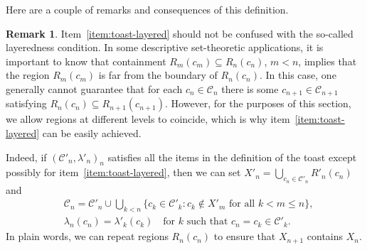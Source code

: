 \documentclass[12pt]{paper}
\numberwithin{equation}{section}
\theoremstyle{plain}
\theoremstyle{definition}
\newtheorem{remark}[theorem]{Remark}
\begin{document}
Here are a couple of remarks and consequences of this definition.

\begin{remark}
  \label{rem:layered-regions}
  Item~\eqref{item:toast-layered} should not be confused with the so-called layeredness condition.
  In some descriptive set-theoretic applications, it is important to know that containment
  \(R_{m}(c_{m}) \subseteq R_{n}(c_{n})\), \(m < n\), implies that the region \(R_{m}(c_{m})\) is
  far from the boundary of \(R_{n}(c_{n})\).  In this case, one generally cannot guarantee that for
  each \(c_{n} \in \mathcal{C}_{n}\) there is some \(c_{n+1} \in \mathcal{C}_{n+1}\) satisfying
  \(R_{n}(c_{n}) \subseteq R_{n+1}(c_{n+1})\).  However, for the purposes of this section, we allow
  regions at different levels to coincide, which is why item~\eqref{item:toast-layered} can be
  easily achieved.

  Indeed, if \((\mathcal{C}'_{n}, \lambda'_{n})_{n}\) satisfies all the items in the definition of
  the toast except possibly for item~\eqref{item:toast-layered}, then we can set
  \(X'_{n} = \bigcup_{c_{n} \in \mathcal{C}'_{n}} R'_{n}(c_{n})\) and
  \begin{displaymath}
    \begin{aligned}
      &\mathcal{C}_{n}
        = \mathcal{C}'_{n} \cup \bigcup_{k < n}\{c_{k} \in \mathcal{C}'_{k} : c_{k}
        \not \in X'_{m} \textrm{ for all } k < m \le n\}, \\
      &\lambda_{n}(c_{n})
        = \lambda'_{k}(c_{k}) \quad \textrm{for \(k\) such that } c_{n} = c_{k} \in \mathcal{C}'_{k}.
    \end{aligned}
  \end{displaymath}
  In plain words, we can repeat regions \(R_n(c_n)\) to ensure that \(X_{n+1}\) contains \(X_{n}\).
\end{remark}
\end{document}

